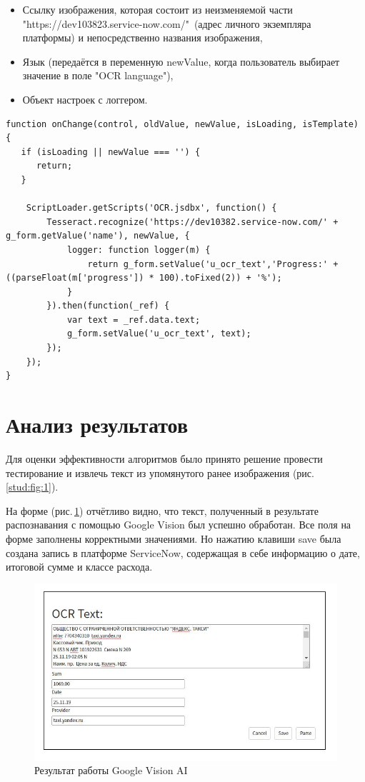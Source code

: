 \documentclass[14pt]{mmcs_article}
\begin{document}
        \begin{itemize}
        \item Ссылку изображения, которая состоит из неизменяемой части\\   "https://dev103823.service-now.com/"\ (адрес личного экземпляра\\ платформы) и непосредственно названия изображения,
        \item Язык (передаётся в переменную newValue, когда пользователь выбирает значение в поле "OCR language"),
        \item Объект настроек с логгером.
        \end{itemize}
        \newpage
\begin{lstlisting}[caption=Распознавание чеков с помощью Tesseract.js, label=stud-lst:1]
function onChange(control, oldValue, newValue, isLoading, isTemplate) {
   if (isLoading || newValue === '') {
      return;
   }

    ScriptLoader.getScripts('OCR.jsdbx', function() {
        Tesseract.recognize('https://dev10382.service-now.com/' + g_form.getValue('name'), newValue, {
            logger: function logger(m) {
                return g_form.setValue('u_ocr_text','Progress:' +  ((parseFloat(m['progress']) * 100).toFixed(2)) + '%');
            }
        }).then(function(_ref) {
            var text = _ref.data.text;
            g_form.setValue('u_ocr_text', text);
        });
    });
}
\end{lstlisting}




\newpage
\section{Анализ результатов}
Для оценки эффективности алгоритмов было принято решение провести тестирование и извлечь текст из упомянутого ранее изображения (рис.\,\ref{stud:fig:1}).

На форме (рис.\,\ref{stud:fig:1234}) отчётливо видно, что текст, полученный в результате распознавания с помощью Google Vision был успешно обработан. Все поля на форме заполнены корректными значениями. Но нажатию клавиши save была создана запись в платформе ServiceNow, содержащая в себе информацию о дате, итоговой сумме и классе расхода.
\begin{figure}[H]
  \centering
  \includegraphics[scale=0.8]{Res.JPG}
  \caption{Результат работы Google Vision AI}\label{stud:fig:1234}
\end{figure}
\end{document}
